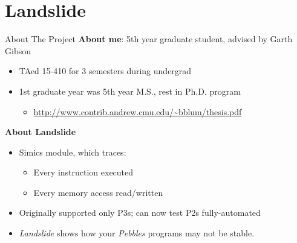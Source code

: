 \documentclass[xcolor=dvipsnames]{beamer}
\begin{document}
%


\section{Landslide}


\begin{frame}{About The Project}
	\textbf{About me}: 5th year graduate student, advised by Garth Gibson
	\begin{itemize}
		\item TAed 15-410 for 3 semesters during undergrad
		\item 1st graduate year was 5th year M.S., rest in Ph.D. program
		\begin{itemize}
			\item \url{http://www.contrib.andrew.cmu.edu/~bblum/thesis.pdf}
		\end{itemize}
	\end{itemize}
	\pause
	\linegap

	{\bf About Landslide}
	\begin{itemize}
		\item Simics module, which traces:
			\begin{itemize}
				\item Every instruction executed
				\item Every memory access read/written
			\end{itemize}
		\item Originally supported only P3s; can now test P2s fully-automated
		\item {\em Landslide} shows how your {\em Pebbles} programs may not be stable.
	\end{itemize}
\end{frame}
\end{document}
